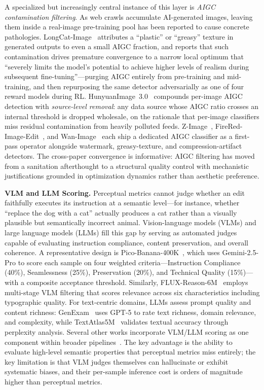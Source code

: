 A specialized but increasingly central instance of this layer is \emph{AIGC contamination filtering}. As web crawls accumulate AI-generated images, leaving them inside a real-image pre-training pool has been reported to cause concrete pathologies. LongCat-Image~\citep{team2025longcat} attributes a ``plastic'' or ``greasy'' texture in generated outputs to even a small AIGC fraction, and reports that such contamination drives premature convergence to a narrow local optimum that ``severely limits the model's potential to achieve higher levels of realism during subsequent fine-tuning''---purging AIGC entirely from pre-training and mid-training, and then repurposing the same detector adversarially as one of four reward models during RL. HunyuanImage~3.0~\citep{cao2025hunyuanimage} compounds per-image AIGC detection with \emph{source-level removal}: any data source whose AIGC ratio crosses an internal threshold is dropped wholesale, on the rationale that per-image classifiers miss residual contamination from heavily polluted feeds. Z-Image~\citep{cai2025z}, FireRed-Image-Edit~\citep{team2026firered}, and Wan-Image~\citep{mao2026wan} each ship a dedicated AIGC classifier as a first-pass operator alongside watermark, greasy-texture, and compression-artifact detectors. The cross-paper convergence is informative: AIGC filtering has moved from a sanitation afterthought to a structural quality control with mechanistic justifications grounded in optimization dynamics rather than aesthetic preference.

\textbf{VLM and LLM Scoring.}
Perceptual metrics cannot judge whether an edit faithfully executes its instruction at a semantic level---for instance, whether ``replace the dog with a cat'' actually produces a cat rather than a visually plausible but semantically incorrect animal. Vision-language models (VLMs) and large language models (LLMs) fill this gap by serving as automated judges capable of evaluating instruction compliance, content preservation, and overall coherence. A representative design is Pico-Banana-400K~\citep{qian2025pico}, which uses Gemini-2.5-Pro to score each sample on four weighted criteria---Instruction Compliance (40\%), Seamlessness (25\%), Preservation (20\%), and Technical Quality (15\%)---with a composite acceptance threshold. Similarly, FLUX-Reason-6M~\citep{fang2025flux} employs multi-stage VLM filtering that scores relevance across six characteristics including typographic quality. For text-centric domains, LLMs assess prompt quality and content richness: GenExam~\citep{wang2025genexam} uses GPT-5 to rate text richness, domain relevance, and complexity, while TextAtlas5M~\citep{wang2025textatlas5m} validates textual accuracy through perplexity analysis. Several other works incorporate VLM/LLM scoring as one component within broader pipelines~\citep{liu2025step1x, wei2024omniedit, ye2025imgedit, taesiri2025understanding}. The key advantage is the ability to evaluate high-level semantic properties that perceptual metrics miss entirely; the key limitation is that VLM judges themselves can hallucinate or exhibit systematic biases, and their per-sample inference cost is orders of magnitude higher than perceptual metrics.

